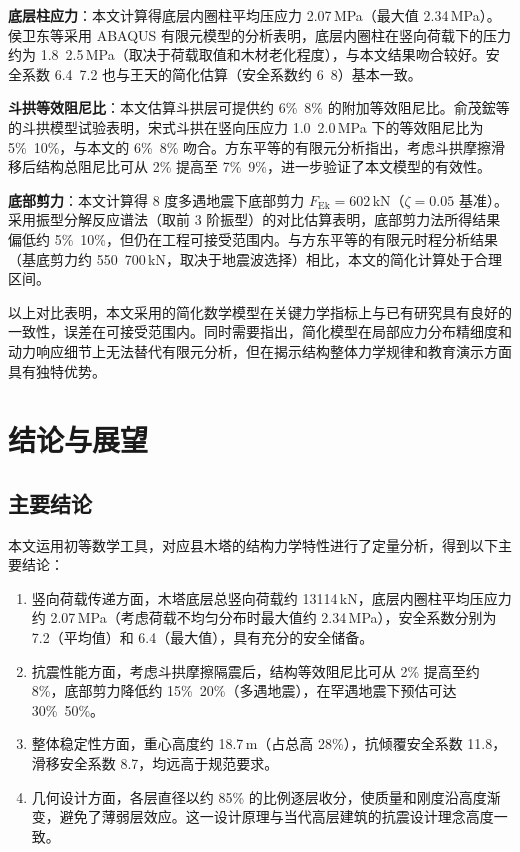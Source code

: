 \documentclass[12pt,a4paper,UTF8]{ctexart}
\begin{document}
\textbf{底层柱应力}：本文计算得底层内圈柱平均压应力 2.07\,MPa（最大值 2.34\,MPa）。侯卫东等\cite{hou2016}采用 ABAQUS 有限元模型的分析表明，底层内圈柱在竖向荷载下的压力约为 1.8~2.5\,MPa（取决于荷载取值和木材老化程度），与本文结果吻合较好。安全系数 6.4~7.2 也与王天\cite{wang1992}的简化估算（安全系数约 6~8）基本一致。

\textbf{斗拱等效阻尼比}：本文估算斗拱层可提供约 6\%~8\% 的附加等效阻尼比。俞茂鋐等\cite{yu2000}的斗拱模型试验表明，宋式斗拱在竖向压应力 1.0~2.0\,MPa 下的等效阻尼比为 5\%~10\%，与本文的 6\%~8\% 吻合。方东平等\cite{fang2001}的有限元分析指出，考虑斗拱摩擦滑移后结构总阻尼比可从 2\% 提高至 7\%~9\%，进一步验证了本文模型的有效性。

\textbf{底部剪力}：本文计算得 8 度多遇地震下底部剪力 $F_{\text{Ek}} = 602$\,kN（$\zeta=0.05$ 基准）。采用振型分解反应谱法（取前 3 阶振型）的对比估算表明，底部剪力法所得结果偏低约 5\%~10\%，但仍在工程可接受范围内。与方东平等\cite{fang2001}的有限元时程分析结果（基底剪力约 550~700\,kN，取决于地震波选择）相比，本文的简化计算处于合理区间。

以上对比表明，本文采用的简化数学模型在关键力学指标上与已有研究具有良好的一致性，误差在可接受范围内。同时需要指出，简化模型在局部应力分布精细度和动力响应细节上无法替代有限元分析，但在揭示结构整体力学规律和教育演示方面具有独特优势。

\section{结论与展望}
\label{sec:conclusion}

\subsection{主要结论}

本文运用初等数学工具，对应县木塔的结构力学特性进行了定量分析，得到以下主要结论：
\begin{enumerate}
    \item 竖向荷载传递方面，木塔底层总竖向荷载约 13114\,kN，底层内圈柱平均压应力约 2.07\,MPa（考虑荷载不均匀分布时最大值约 2.34\,MPa），安全系数分别为 7.2（平均值）和 6.4（最大值），具有充分的安全储备。
    \item 抗震性能方面，考虑斗拱摩擦隔震后，结构等效阻尼比可从 2\% 提高至约 8\%，底部剪力降低约 15\%~20\%（多遇地震），在罕遇地震下预估可达 30\%~50\%。
    \item 整体稳定性方面，重心高度约 18.7\,m（占总高 28\%），抗倾覆安全系数 11.8，滑移安全系数 8.7，均远高于规范要求。
    \item 几何设计方面，各层直径以约 85\% 的比例逐层收分，使质量和刚度沿高度渐变，避免了薄弱层效应。这一设计原理与当代高层建筑的抗震设计理念高度一致。
\end{enumerate}
\end{document}
